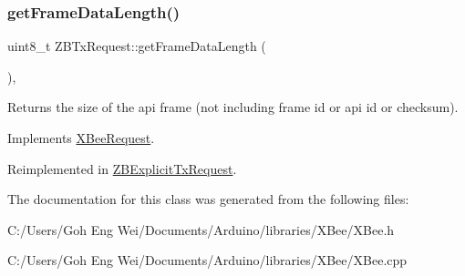 \hypertarget{class_z_b_tx_request_a8e6914c1f556981a0f863c57c57d053b}{}\label{class_z_b_tx_request_a8e6914c1f556981a0f863c57c57d053b} 
\subsubsection{\texorpdfstring{get\+Frame\+Data\+Length()}{getFrameDataLength()}}
{\footnotesize\ttfamily uint8\+\_\+t Z\+B\+Tx\+Request\+::get\+Frame\+Data\+Length (\begin{DoxyParamCaption}{ }\end{DoxyParamCaption})\hspace{0.3cm}{\ttfamily [protected]}, {\ttfamily [virtual]}}

Returns the size of the api frame (not including frame id or api id or checksum). 

Implements \hyperlink{class_x_bee_request_a03b6c558db5836fa7167c0fba7405642}{X\+Bee\+Request}.



Reimplemented in \hyperlink{class_z_b_explicit_tx_request_a2dfcaf9ec7520f129b68966f814e318f}{Z\+B\+Explicit\+Tx\+Request}.



The documentation for this class was generated from the following files\+:\begin{DoxyCompactItemize}
\item 
C\+:/\+Users/\+Goh Eng Wei/\+Documents/\+Arduino/libraries/\+X\+Bee/X\+Bee.\+h\item 
C\+:/\+Users/\+Goh Eng Wei/\+Documents/\+Arduino/libraries/\+X\+Bee/X\+Bee.\+cpp\end{DoxyCompactItemize}
